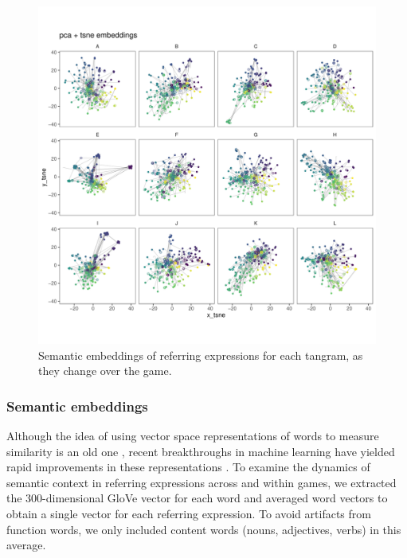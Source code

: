 \documentclass[alpha-refs]{wiley-article}
\begin{document}
\begin{figure}[t!]
\centering
\includegraphics[scale=.3]{tsne_embeddings.pdf}
\caption{Semantic embeddings of referring expressions for each tangram, as they change over the game. }
\label{fig:tsne}
\end{figure}

\subsubsection{Semantic embeddings}

Although the idea of using vector space representations of words to measure similarity is an old one \cite{XXX}, recent breakthroughs in machine learning have yielded rapid improvements in these representations \cite{XXX}.
To examine the dynamics of semantic context in referring expressions across and within games, we extracted the 300-dimensional GloVe vector for each word \cite{} and averaged word vectors to obtain a single vector for each referring expression.
To avoid artifacts from function words, we only included content words (nouns, adjectives, verbs) in this average.
\end{document}
